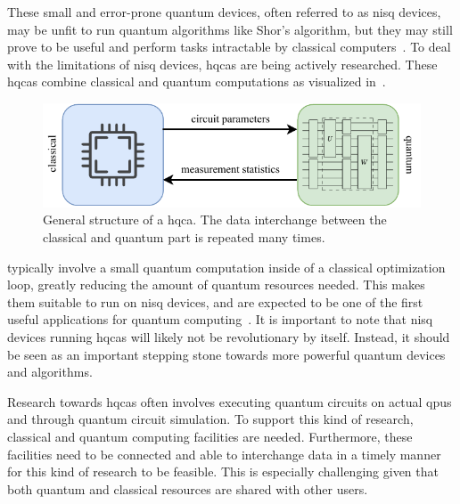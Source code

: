 These small and error-prone quantum devices, often referred to as \gls{nisq} devices, may be unfit to run quantum algorithms like Shor's algorithm, but they may still prove to be useful and perform tasks intractable by classical computers~\cite{preskill2018quantum, bravyi2020quantum}.
To deal with the limitations of \gls{nisq} devices, \glspl{hqca} are being actively researched.
These \glspl{hqca} combine classical and quantum computations as visualized in~.
\begin{figure}[ht]
    \centering
    \includegraphics[width=0.85\linewidth]{figures/hybrid-quantum-algorithm.pdf}
    \caption[General structure of a \acrshort{hqca}.]{
        General structure of a \gls{hqca}.
        The data interchange between the classical and quantum part is repeated many times.
    }
    \label{fig:hybrid-quantum-classical}
\end{figure}
 typically involve a small quantum computation inside of a classical optimization loop, greatly reducing the amount of quantum resources needed.
This makes them suitable to run on \gls{nisq} devices, and are expected to be one of the first useful applications for quantum computing~\cite{endo2021hybrid}.
It is important to note that \gls{nisq} devices running \glspl{hqca} will likely not be revolutionary by itself.
Instead, it should be seen as an important stepping stone towards more powerful quantum devices and algorithms.

Research towards \glspl{hqca} often involves executing quantum circuits on actual \glspl{qpu} and through quantum circuit simulation.
To support this kind of research, classical and quantum computing facilities are needed.
Furthermore, these facilities need to be connected and able to interchange data in a timely manner for this kind of research to be feasible.
This is especially challenging given that both quantum and classical resources are shared with other users.

